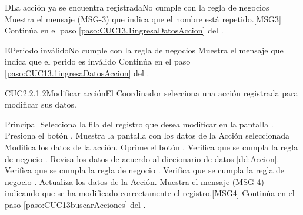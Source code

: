 		\begin{UCtrayectoriaA}{D}{La acción ya se encuentra registrada}{No cumple con la regla de negocios }
			\UCpaso Muestra el mensaje (MSG-3) que indica que el nombre está repetido.\ref{MSG3}
			\UCpaso Continúa en el paso \ref{paso:CUC13.1ingresaDatosAccion} del .
		\end{UCtrayectoriaA}
		\begin{UCtrayectoriaA}{E}{Periodo inválido}{No cumple con la regla de negocios }
			\UCpaso Muestra el mensaje  que indica que el perido es inválido
			\UCpaso Continúa en el paso \ref{paso:CUC13.1ingresaDatosAccion} del .
		\end{UCtrayectoriaA}

	\begin{UseCase}{CUC2.2.1.2}{Modificar acción}{El Coordinador selecciona una acción registrada para modificar sus datos.}
	\end{UseCase}

	\begin{UCtrayectoria}{Principal}
			\UCpaso[\UCactor] Selecciona la fila del registro que desea modificar en la pantalla .	
			\UCpaso[\UCactor] Presiona el botón . 
			\UCpaso Muestra la pantalla  con los datos de la Acción seleccionada
                        \UCpaso [\UCactor] Modifica los datos de la acción.\label{paso:CUC13.2modificarDatosAccion}
			\UCpaso [\UCactor] Oprime el botón .
			\UCpaso Verifica que se cumpla la regla de negocio .  
			\UCpaso Revisa los datos de acuerdo al diccionario de datos \ref{dd:Accion}. 
			\UCpaso Verifica que se cumpla la regla de negocio .  
			\UCpaso Verifica que se cumpla la regla de negocio .  
			\UCpaso Actualiza los datos de la Acción.
			\UCpaso Muestra el mensaje (MSG-4) indicando que se ha modificado correctamente el registro.\ref{MSG4}
			\UCpaso Continúa en el paso \ref{paso:CUC13buscarAcciones} del .
	\end{UCtrayectoria}

